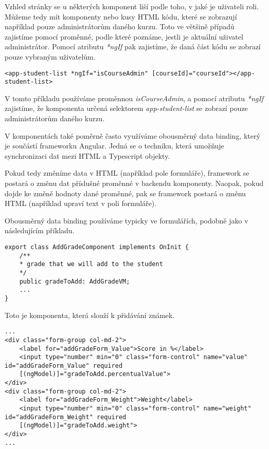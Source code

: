 Vzhled stránky se u některých komponent liší podle toho, v jaké je uživateli roli. Můžeme tedy mít komponenty nebo kusy HTML kódu, které se zobrazují například pouze administrátorům daného kurzu.
Toto ve většině případů zajistíme pomocí proměnné, podle které poznáme, jestli je aktuální uživatel administrátor.
Pomocí atributu \textit{*ngIf} pak zajistíme, že daná část kódu se zobrazí pouze vybraným uživatelům.

\begin{lstlisting}
<app-student-list *ngIf="isCourseAdmin" [courseId]="courseId"></app-student-list>
\end{lstlisting}

V tomto příkladu používáme proměnnou \textit{isCourseAdmin}, a pomocí atributu \textit{*ngIf} zajistíme, že komponenta určená selektorem \textit{app-student-list} se zobrazí pouze administrátorům daného kurzu. 

\vspace{\baselineskip}

V komponentách také poměrně často využíváme obousměrný data binding, který je součástí frameworku Angular. Jedná se o techniku, která umožňuje synchronizaci dat mezi HTML a Typescript objekty.

Pokud tedy změníme data v HTML (například pole formuláře), framework se postará o změnu dat příslušné proměnné v backendu komponenty. Naopak, pokud dojde ke změně hodnoty dané proměnné, pak se framework postará o změnu HTML (například upraví text v poli formuláře).

Obousměrný data binding používáme typicky ve formulářích, podobně jako v následujícím příkladu.

\lstset{style=typescript}
\begin{lstlisting}
export class AddGradeComponent implements OnInit {
	/**
	* grade that we will add to the student
	*/
	public gradeToAdd: AddGradeVM;
	...
}
\end{lstlisting}

Toto je komponenta, která slouží k přidávání známek. 

\lstset{style=html}
\begin{lstlisting}
...
<div class="form-group col-md-2">
	<label for="addGradeForm_Value">Score in %</label>
	<input type="number" min="0" class="form-control" name="value" id="addGradeForm_Value" required
	[(ngModel)]="gradeToAdd.percentualValue">
</div>
<div class="form-group col-md-2">
	<label for="addGradeForm_Weight">Weight</label>
	<input type="number" min="0" class="form-control" name="weight" id="addGradeForm_Weight" required
	[(ngModel)]="gradeToAdd.weight">
</div>
...
\end{lstlisting}

